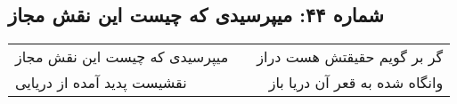 \begin{center}
\section*{شماره ۴۴: میپرسیدی که چیست این نقش مجاز}
\label{sec:044}
\begin{longtable}{l p{0.5cm} r}
میپرسیدی که چیست این نقش مجاز
&&
گر بر گویم حقیقتش هست دراز
\\
نقشیست پدید آمده از دریایی
&&
وانگاه شده به قعر آن دریا باز
\\
\end{longtable}
\end{center}
